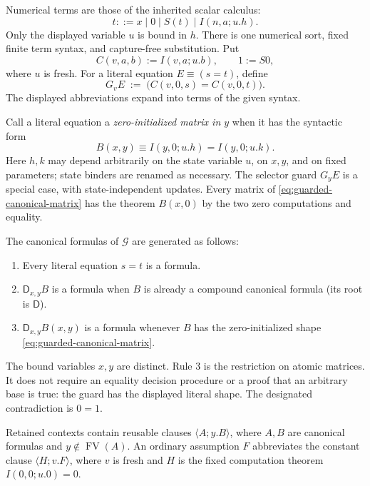 \documentclass[11pt,letterpaper]{article}
\theoremstyle{definition}
\begin{document}
Numerical terms are those of the inherited scalar calculus:
\[
 t ::= x\mid 0\mid S(t)\mid I(n,a;u.h).
\]
Only the displayed variable $u$ is bound in $h$.  There is one numerical
sort, fixed finite term syntax, and capture-free substitution.  Put
\[
 C(v,a,b):=I(v,a;u.b),\qquad 1:=S0,
\]
where $u$ is fresh.  For a literal equation $E\equiv(s=t)$, define
\[
 G_v E\;:=\;\bigl(C(v,0,s)=C(v,0,t)\bigr).
\tag{Guard}\label{eq:guarded-guard}
\]
The displayed abbreviations expand into terms of the given syntax.

Call a literal equation a \emph{zero-initialized matrix in $y$} when it
has the syntactic form
\[
 B(x,y)\equiv
 I(y,0;u.h)=I(y,0;u.k).
 \tag{Canonical atomic matrix}\label{eq:guarded-canonical-matrix}
\]
Here $h,k$ may depend arbitrarily on the state variable $u$, on $x,y$,
and on fixed parameters; state binders are renamed as necessary.
The selector guard $G_yE$ is a special case, with state-independent
updates.  Every matrix of \eqref{eq:guarded-canonical-matrix} has the
theorem $B(x,0)$ by the two zero computations and equality.

The canonical formulas of $\mathcal G$ are generated as follows:
\begin{enumerate}
\item Every literal equation $s=t$ is a formula.
\item $\mathsf D_{x,y}B$ is a formula when $B$ is already a compound
      canonical formula (its root is $\mathsf D$).
\item $\mathsf D_{x,y}B(x,y)$ is a formula whenever $B$ has the
      zero-initialized shape \eqref{eq:guarded-canonical-matrix}.
\end{enumerate}
The bound variables $x,y$ are distinct.  Rule 3 is the restriction on
atomic matrices.  It does not require an equality decision procedure or
a proof that an arbitrary base is true: the guard has the displayed
literal shape.  The designated contradiction is $0=1$.

Retained contexts contain reusable clauses
$\langle A;y.B\rangle$, where $A,B$ are canonical formulas and
$y\notin\operatorname{FV}(A)$.  An ordinary assumption $F$ abbreviates
the constant clause $\langle H;v.F\rangle$, where $v$ is fresh and
$H$ is the fixed computation theorem $I(0,0;u.0)=0$.
\end{document}
